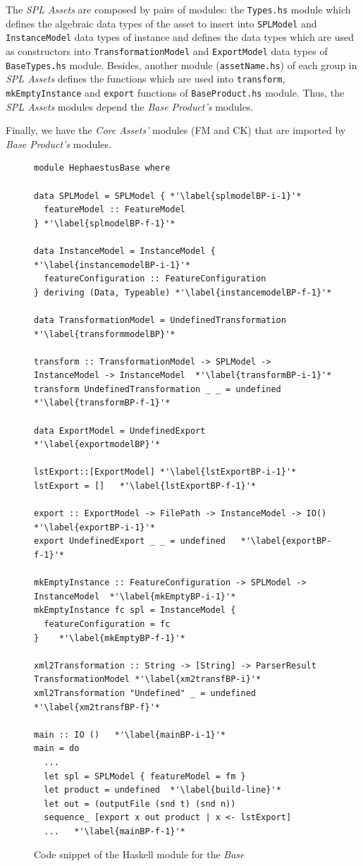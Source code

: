 The \textit{SPL Assets} are composed by pairs of modules: the \texttt{Types.hs} module which defines the algebraic data types of the asset to insert into \texttt{SPLModel} and \texttt{InstanceModel} data types of \hpl{} instance and defines the data types which are used as constructors into \texttt{TransformationModel} and \texttt{ExportModel} data types of \texttt{BaseTypes.hs} module. 
Besides, another module (\texttt{assetName.hs}) of each group in \textit{SPL Assets} defines the functions which are used into \texttt{transform}, \texttt{mkEmptyInstance} and \texttt{export} functions of \texttt{BaseProduct.hs} module. Thus, the \textit{SPL Assets} modules depend the \textit{Base Product's} modules.

Finally, we have the \textit{Core Assets'} modules (FM and CK) that are imported by \textit{Base Product's} modules.


\begin{figure}
\begin{lstlisting}
module HephaestusBase where

data SPLModel = SPLModel { *'\label{splmodelBP-i-1}'*
  featureModel :: FeatureModel
} *'\label{splmodelBP-f-1}'*

data InstanceModel = InstanceModel { *'\label{instancemodelBP-i-1}'*
  featureConfiguration :: FeatureConfiguration
} deriving (Data, Typeable) *'\label{instancemodelBP-f-1}'*

data TransformationModel = UndefinedTransformation *'\label{transformmodelBP}'*

transform :: TransformationModel -> SPLModel -> InstanceModel -> InstanceModel  *'\label{transformBP-i-1}'*
transform UndefinedTransformation _ _ = undefined  *'\label{transformBP-f-1}'*

data ExportModel = UndefinedExport *'\label{exportmodelBP}'*

lstExport::[ExportModel] *'\label{lstExportBP-i-1}'*
lstExport = []   *'\label{lstExportBP-f-1}'*

export :: ExportModel -> FilePath -> InstanceModel -> IO()  *'\label{exportBP-i-1}'*
export UndefinedExport _ _ = undefined   *'\label{exportBP-f-1}'*

mkEmptyInstance :: FeatureConfiguration -> SPLModel -> InstanceModel  *'\label{mkEmptyBP-i-1}'*
mkEmptyInstance fc spl = InstanceModel {
  featureConfiguration = fc
}    *'\label{mkEmptyBP-f-1}'*

xml2Transformation :: String -> [String] -> ParserResult TransformationModel *'\label{xm2transfBP-i}'*
xml2Transformation "Undefined" _ = undefined *'\label{xm2transfBP-f}'*

main :: IO ()   *'\label{mainBP-i-1}'*
main = do
  ...
  let spl = SPLModel { featureModel = fm }
  let product = undefined  *'\label{build-line}'*
  let out = (outputFile (snd t) (snd n))
  sequence_ [export x out product | x <- lstExport]
  ...   *'\label{mainBP-f-1}'*
\end{lstlisting}
\caption{Code snippet of the Haskell module for the \hp{} \emph{Base}}
\label{fig:code-HephaestusBase}
\end{figure}

